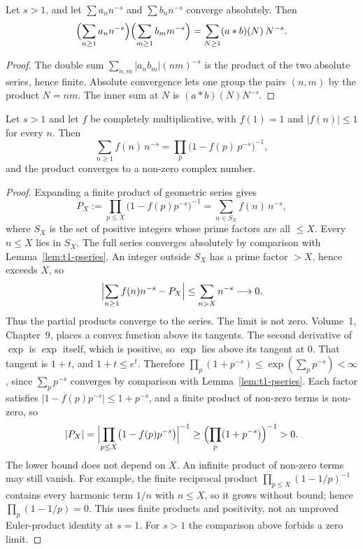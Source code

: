 \begin{lemma}\label{lem:t1-dseries}
Let $s>1$, and let $\sum a_nn^{-s}$ and $\sum b_nn^{-s}$ converge absolutely. Then
\[
\Bigl(\sum_{n\ge1}a_nn^{-s}\Bigr)\Bigl(\sum_{m\ge1}b_mm^{-s}\Bigr)
=\sum_{N\ge1}(a*b)(N)\,N^{-s}.
\]
\end{lemma}
\begin{proof}
The double sum $\sum_{n,m}|a_nb_m|(nm)^{-s}$ is the product of the two absolute series, hence finite. Absolute convergence lets one group the pairs $(n,m)$ by the product $N=nm$. The inner sum at $N$ is $(a*b)(N)N^{-s}$.
\end{proof}

\begin{theorem}\label{thm:t1-eulerprod}
Let $s>1$ and let $f$ be completely multiplicative, with $f(1)=1$ and $|f(n)|\le1$ for every $n$. Then
\[
\sum_{n\ge1}f(n)\,n^{-s}=\prod_p\bigl(1-f(p)\,p^{-s}\bigr)^{-1},
\]
and the product converges to a non-zero complex number.
\end{theorem}
\begin{proof}
Expanding a finite product of geometric series gives
\[
P_X:=\prod_{p\le X}\bigl(1-f(p)p^{-s}\bigr)^{-1}
=\sum_{n\in S_X}f(n)\,n^{-s},
\]
where $S_X$ is the set of positive integers whose prime factors are all $\le X$. Every $n\le X$ lies in $S_X$. The full series converges absolutely by comparison with Lemma~\ref{lem:t1-pseries}. An integer outside $S_X$ has a prime factor $>X$, hence exceeds $X$, so
\[
\Bigl|\sum_{n\ge1}f(n)n^{-s}-P_X\Bigr|
\le\sum_{n>X}n^{-s}\longrightarrow0.
\]
Thus the partial products converge to the series. The limit is not zero. Volume~1, Chapter~9, places a convex function above its tangents. The second derivative of $\exp$ is $\exp$ itself, which is positive, so $\exp$ lies above its tangent at $0$. That tangent is $1+t$, and $1+t\le e^t$. Therefore $\prod_p(1+p^{-s})\le\exp(\sum_pp^{-s})<\infty$, since $\sum_pp^{-s}$ converges by comparison with Lemma~\ref{lem:t1-pseries}. Each factor satisfies $|1-f(p)p^{-s}|\le1+p^{-s}$, and a finite product of non-zero terms is non-zero, so
\[
|P_X|=\Bigl|\prod_{p\le X}\bigl(1-f(p)p^{-s}\bigr)\Bigr|^{-1}
\ge\Bigl(\prod_p(1+p^{-s})\Bigr)^{-1}>0.
\]
The lower bound does not depend on $X$. An infinite product of non-zero terms may still vanish. For example, the finite reciprocal product $\prod_{p\le X}(1-1/p)^{-1}$ contains every harmonic term $1/n$ with $n\le X$, so it grows without bound; hence $\prod_p(1-1/p)=0$. This uses finite products and positivity, not an unproved Euler-product identity at $s=1$. For $s>1$ the comparison above forbids a zero limit.
\end{proof}


